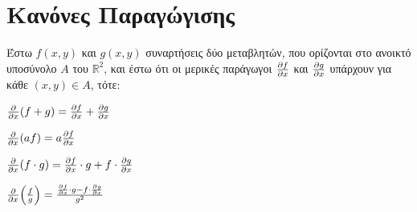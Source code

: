\section{Κανόνες Παραγώγισης}

Έστω $ f(x,y) $ και $ g(x,y) $ συναρτήσεις δύο μεταβλητών, που ορίζονται στο 
ανοικτό υποσύνολο $ A $ του $ \mathbb{R}^{2} $, και έστω ότι οι μερικές παράγωγοι 
$ \pdv{f}{x} $ και $ \pdv{g}{x} $ υπάρχουν για κάθε $ (x,y) \in A $, τότε:
\begin{myitemize}
    \item $ \pdv{x}(f+g) = \pdv{f}{x} + \pdv{g}{x} $
    \item $ \pdv{x}(af) = a \pdv{f}{x} $ 
    \item $ \pdv{x}(f\cdot g) = \pdv{f}{x} \cdot g + f \cdot \pdv{g}{x} $
    \item $ \pdv{x}(\frac{f}{g}) = \frac{\pdv{f}{x} \cdot g - f \cdot 
        \pdv{g}{x}}{g^{2}} $
\end{myitemize}

